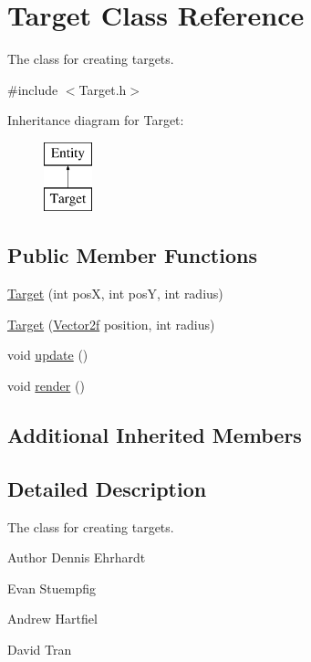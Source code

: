 \hypertarget{classTarget}{\section{Target Class Reference}
\label{classTarget}
}


The class for creating targets.  




{\ttfamily \#include $<$Target.\-h$>$}

Inheritance diagram for Target\-:\begin{figure}[H]
\begin{center}
\leavevmode
\includegraphics[height=2.000000cm]{classTarget}
\end{center}
\end{figure}
\subsection*{Public Member Functions}
\begin{DoxyCompactItemize}
\item 
\hyperlink{classTarget_ab29ccfc5d42140d4cb1a4ae06bf4aab6}{Target} (int pos\-X, int pos\-Y, int radius)
\item 
\hyperlink{classTarget_a1c253c2c60ff0dd65935c189fd4da1ce}{Target} (\hyperlink{classVector2}{Vector2f} position, int radius)
\item 
void \hyperlink{classTarget_a33e3e447eeba8ded77cb3becf30f98d3}{update} ()
\item 
void \hyperlink{classTarget_a5230b99d26495595cf6879dd6816277a}{render} ()
\end{DoxyCompactItemize}
\subsection*{Additional Inherited Members}


\subsection{Detailed Description}
The class for creating targets. 

\begin{DoxyAuthor}{Author}
Dennis Ehrhardt 

Evan Stuempfig 

Andrew Hartfiel 

David Tran 
\end{DoxyAuthor}


